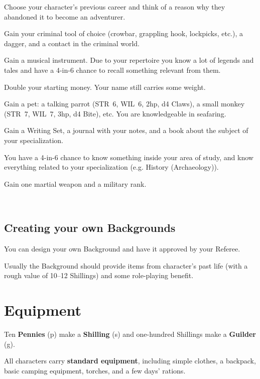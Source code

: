 \documentclass[itdr]{subfiles}
\begin{document}
Choose your character's previous career and think of a reason why they abandoned it to become an adventurer.

Gain your criminal tool of choice (crowbar, grappling hook, lockpicks, etc.), a dagger, and a contact in the criminal world.

Gain a musical instrument. Due to your repertoire you know a lot of legends and tales and have a 4-in-6 chance to recall something relevant from them.

Double your starting money. Your name still carries some weight.

Gain a pet: a talking parrot (STR~6, WIL~6, 2hp, d4 Claws), a small monkey (STR~7, WIL~7, 3hp, d4 Bite), etc. You are knowledgeable in seafaring.

Gain a Writing Set, a journal with your notes, and a book about the subject of your specialization.

You have a 4-in-6 chance to know something inside your area of study, and know everything related to your specialization (e.g. History (Archaeology)).

Gain one martial weapon and a military rank.

~

\begin{dbox}
\subsection*{Creating your own Backgrounds}

You can design your own Background and have it approved by your Referee.

Usually the Background should provide items from character's past life (with a rough value of 10--12 Shillings) and some role-playing benefit.
\end{dbox}

\vfill
\clearpage


\section{Equipment}

Ten \textbf{Pennies} (p) make a \textbf{Shilling} (s) and one-hundred Shillings make a \textbf{Guilder} (g).

All characters carry \textbf{standard equipment}, including simple clothes, a backpack, basic camping equipment, torches, and a few days' rations.
\end{document}
